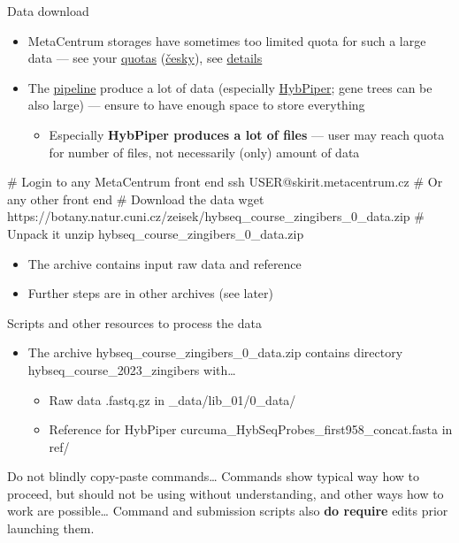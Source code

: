\documentclass[compress,  xelatex, 11pt, xcolor=x11names, aspectratio=169,
	hyperref={
		bookmarks=true,
		unicode=true,
		colorlinks=true,
		pdftitle={HybSeq course},
		plainpages=false,
		pdfauthor={Vojtech Zeisek},
		pdfsubject={Practical processing of HybSeq target enrichment sequencing data on computing grids like MetaCentrum},
		pdfcreator={XeLaTeX},
		pdfkeywords={BASH, command line, GNU, HybSeq, Linux, MetaCentrum, sequencing shell, target enrichment},
		linkcolor=Turquoise4, %
		anchorcolor=DodgerBlue4, %
		citecolor=DodgerBlue4, %
		filecolor=DodgerBlue4, %
		menucolor=Tan4, %
		urlcolor=DarkOliveGreen4 %
		},
	url={hyphens, lowtilde} %
	]{beamer}
\renewcommand{\texttt}[1]{\colorbox{Cornsilk2}{{\ttfamily #1}}}
\renewcommand{\alert}[1]{\textcolor{OrangeRed3}{#1}}
\begin{document}
\begin{frame}[fragile]{Data download}
	\label{datadownload}
	\begin{itemize}
		\item MetaCentrum storages have sometimes too limited quota for such a large data --- see your \href{https://metavo.metacentrum.cz/en/myaccount/kvoty}{quotas} (\href{http://metavo.metacentrum.cz/cs/myaccount/kvoty}{česky}), see \href{https://docs.metacentrum.cz/data/quotas/}{details}
		\item The \href{https://github.com/V-Z/hybseq-scripts}{pipeline} produce a lot of data (especially \href{https://github.com/mossmatters/HybPiper/}{HybPiper}; gene trees can be also large) --- ensure to have enough space to store everything
		\begin{itemize}
			\item Especially \textbf{HybPiper produces a lot of files} --- \alert{user may reach quota for number of files}, not necessarily (only) amount of data
		\end{itemize}
	\end{itemize}
	\begin{bashcode}
    # Login to any MetaCentrum front end
    ssh USER@skirit.metacentrum.cz # Or any other front end
    # Download the data
    wget https://botany.natur.cuni.cz/zeisek/hybseq_course_zingibers_0_data.zip
    # Unpack it
    unzip hybseq_course_zingibers_0_data.zip
	\end{bashcode}
	\begin{itemize}
		 \item The archive contains input raw data and reference
		 \item Further steps are in other archives (see later)
	\end{itemize}
\end{frame}

\begin{frame}{Scripts and other resources to process the data}
	\begin{itemize}
		\item The archive \texttt{hybseq\_course\_zingibers\_0\_data.zip} contains directory \texttt{hybseq\_course\_2023\_zingibers} with\ldots
		\begin{itemize}
			\item Raw data \texttt{*.fastq.gz} in \texttt{1\_data/lib\_01/0\_data/}
			\item Reference for HybPiper \texttt{curcuma\_HybSeqProbes\_first958\_concat.fasta} in \texttt{ref/}
		\end{itemize}
	\end{itemize}
	\begin{alertblock}{Do not blindly copy-paste commands\ldots}
		\alert{Commands show typical way how to proceed, but should not be using without understanding, and other ways how to work are possible\ldots}{ }Command and submission scripts also \textbf{do require} edits prior launching them.
	\end{alertblock}
\end{frame}
\end{document}
